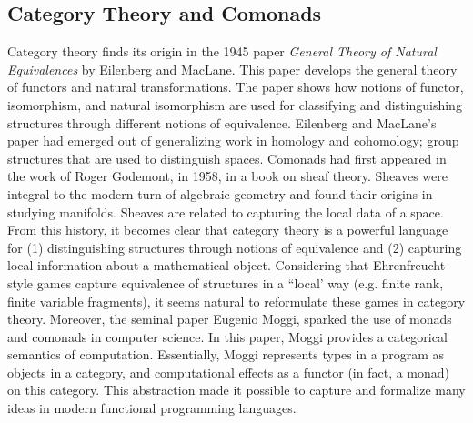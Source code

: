 \subsection{Category Theory and Comonads}
Category theory finds its origin in the 1945 paper \textit{General Theory of Natural Equivalences} by Eilenberg and MacLane. This paper develops the general theory of functors and natural transformations. The paper shows how notions of functor, isomorphism, and natural isomorphism are used for classifying and distinguishing structures through different notions of equivalence. Eilenberg and MacLane's paper had emerged out of generalizing work in homology and cohomology; group structures that are used to distinguish spaces. Comonads had first appeared in the work of Roger Godemont, in 1958, in a book on sheaf theory. Sheaves were integral to the modern turn of algebraic geometry and found their origins in studying manifolds. Sheaves are related to capturing the local data of a space. From this history, it becomes clear that category theory is a powerful language for (1) distinguishing structures through notions of equivalence and (2) capturing local information about a mathematical object. Considering that Ehrenfreucht-{\Fraisse} style games capture equivalence of structures in a ``local' way (e.g. finite rank, finite variable fragments), it seems natural to reformulate these games in category theory. Moreover, the seminal paper \cite{Moggi1991} Eugenio Moggi, sparked the use of monads and comonads in computer science. In this paper, Moggi provides a categorical semantics of computation. Essentially, Moggi represents types in a program as objects in a category, and computational effects as a functor (in fact, a monad) on this category. This abstraction made it possible to capture and formalize many ideas in modern functional programming languages.  
